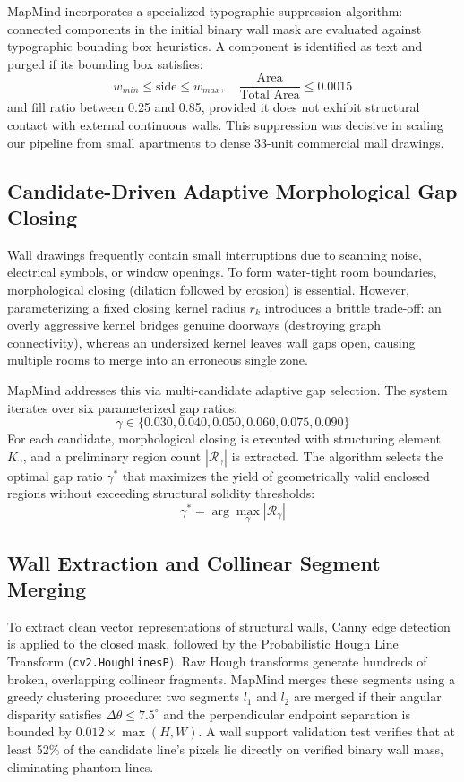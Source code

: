 \documentclass[conference]{IEEEtran}
\begin{document}
MapMind incorporates a specialized typographic suppression algorithm: connected components in the initial binary wall mask are evaluated against typographic bounding box heuristics. A component is identified as text and purged if its bounding box satisfies:
\begin{equation}
w_{min} \le \text{side} \le w_{max}, \quad \frac{\text{Area}}{\text{Total Area}} \le 0.0015
\end{equation}
and fill ratio between 0.25 and 0.85, provided it does not exhibit structural contact with external continuous walls. This suppression was decisive in scaling our pipeline from small apartments to dense 33-unit commercial mall drawings.

\subsection{Candidate-Driven Adaptive Morphological Gap Closing}
Wall drawings frequently contain small interruptions due to scanning noise, electrical symbols, or window openings. To form water-tight room boundaries, morphological closing (dilation followed by erosion) is essential. However, parameterizing a fixed closing kernel radius $r_k$ introduces a brittle trade-off: an overly aggressive kernel bridges genuine doorways (destroying graph connectivity), whereas an undersized kernel leaves wall gaps open, causing multiple rooms to merge into an erroneous single zone.

MapMind addresses this via multi-candidate adaptive gap selection. The system iterates over six parameterized gap ratios:
\begin{equation}
\gamma \in \{0.030, 0.040, 0.050, 0.060, 0.075, 0.090\}
\end{equation}
For each candidate, morphological closing is executed with structuring element $K_\gamma$, and a preliminary region count $|\mathcal{R}_\gamma|$ is extracted. The algorithm selects the optimal gap ratio $\gamma^*$ that maximizes the yield of geometrically valid enclosed regions without exceeding structural solidity thresholds:
\begin{equation}
\gamma^* = \arg\max_{\gamma} |\mathcal{R}_\gamma|
\end{equation}

\subsection{Wall Extraction and Collinear Segment Merging}
To extract clean vector representations of structural walls, Canny edge detection is applied to the closed mask, followed by the Probabilistic Hough Line Transform (\texttt{cv2.HoughLinesP}). Raw Hough transforms generate hundreds of broken, overlapping collinear fragments. MapMind merges these segments using a greedy clustering procedure: two segments $l_1$ and $l_2$ are merged if their angular disparity satisfies $\Delta \theta \le 7.5^\circ$ and the perpendicular endpoint separation is bounded by $0.012 \times \max(H, W)$. A wall support validation test verifies that at least 52\% of the candidate line's pixels lie directly on verified binary wall mass, eliminating phantom lines.
\end{document}
